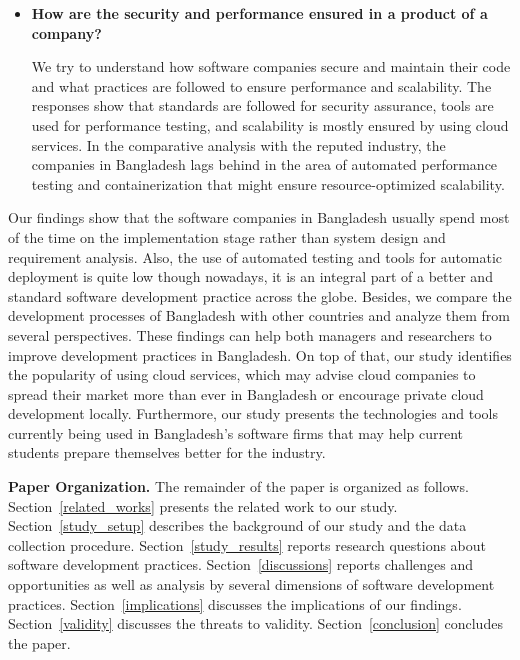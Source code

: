 \begin{itemize}[leftmargin=10pt]
    \item \textbf{How are the security and performance ensured in a product of a company?}
        
    We try to understand how software companies secure and maintain their code and what practices are followed to ensure performance and scalability. The responses show that standards are followed for security assurance, tools are used for performance testing, and scalability is mostly ensured by using cloud services. In the comparative analysis with the reputed industry, the companies in Bangladesh lags behind in the area of automated performance testing and containerization that might ensure resource-optimized scalability.     
   
    
    
    
    
\end{itemize}

Our findings show that the software companies in Bangladesh usually spend most of the time on the implementation stage rather than system design and requirement analysis. Also, the use of automated testing and tools for automatic deployment is quite low though nowadays, it is an integral part of a better and standard software development practice across the globe. Besides, we compare the development processes of Bangladesh with other countries and analyze them from several perspectives. These findings can help both managers and researchers to improve development practices in Bangladesh. On top of that, our study identifies the popularity of using cloud services, which may advise cloud companies to spread their market more than ever in Bangladesh or encourage private cloud development locally. Furthermore, our study presents the technologies and tools currently being used in Bangladesh's software firms that may help current students prepare themselves better for the industry.

\noindent\textbf{Paper Organization.} The remainder of the paper is organized as follows. Section~\ref{related_works} presents the related work to our study. Section~\ref{study_setup} describes the background of our study and the data collection procedure. Section~\ref{study_results} reports research questions about software development practices. Section~\ref{discussions} reports challenges and opportunities as well as analysis by several dimensions of software development practices. Section~\ref{implications} discusses the implications of our findings. Section~\ref{validity} discusses the threats to validity. Section~\ref{conclusion} concludes the paper.
